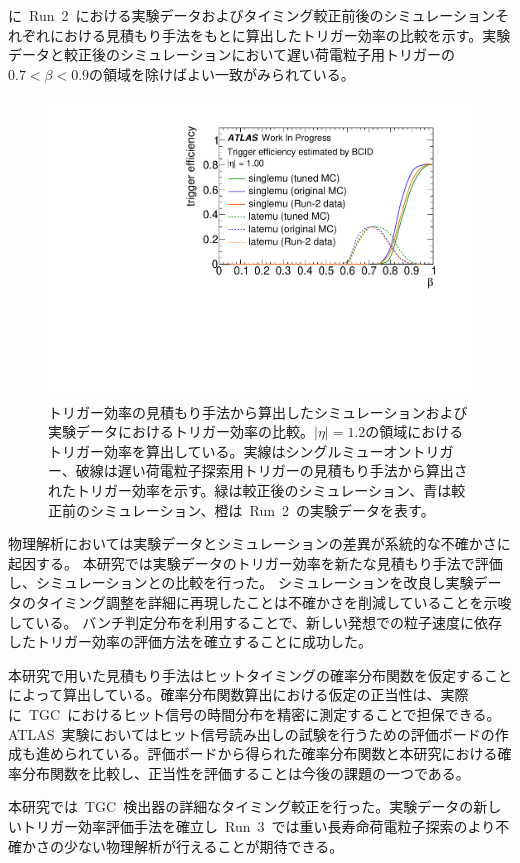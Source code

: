 に~Run~2~における実験データおよびタイミング較正前後のシミュレーションそれぞれにおける見積もり手法をもとに算出したトリガー効率の比較を示す。実験データと較正後のシミュレーションにおいて遅い荷電粒子用トリガーの$0.7<\beta<0.9$の領域を除けばよい一致がみられている。
\begin{figure}[tbp]
    \centering   
    \includegraphics[width=\textwidth,page=4]{img/rec/est_eff.pdf}
    \caption[トリガー効率の見積もり手法から算出したシミュレーションおよび実験データにおけるトリガー効率の比較]{トリガー効率の見積もり手法から算出したシミュレーションおよび実験データにおけるトリガー効率の比較。$|\eta|=1.2$の領域におけるトリガー効率を算出している。実線はシングルミューオントリガー、破線は遅い荷電粒子探索用トリガーの見積もり手法から算出されたトリガー効率を示す。緑は較正後のシミュレーション、青は較正前のシミュレーション、橙は~Run~2~の実験データを表す。}\label{fig:rectri}
\end{figure}

物理解析においては実験データとシミュレーションの差異が系統的な不確かさに起因する。
本研究では実験データのトリガー効率を新たな見積もり手法で評価し、シミュレーションとの比較を行った。
シミュレーションを改良し実験データのタイミング調整を詳細に再現したことは不確かさを削減していることを示唆している。
バンチ判定分布を利用することで、新しい発想での粒子速度に依存したトリガー効率の評価方法を確立することに成功した。

本研究で用いた見積もり手法はヒットタイミングの確率分布関数を仮定することによって算出している。確率分布関数算出における仮定の正当性は、実際に~TGC~におけるヒット信号の時間分布を精密に測定することで担保できる。ATLAS~実験においてはヒット信号読み出しの試験を行うための評価ボードの作成も進められている。評価ボードから得られた確率分布関数と本研究における確率分布関数を比較し、正当性を評価することは今後の課題の一つである。

本研究では~TGC~検出器の詳細なタイミング較正を行った。実験データの新しいトリガー効率評価手法を確立し~Run~3~では重い長寿命荷電粒子探索のより不確かさの少ない物理解析が行えることが期待できる。
